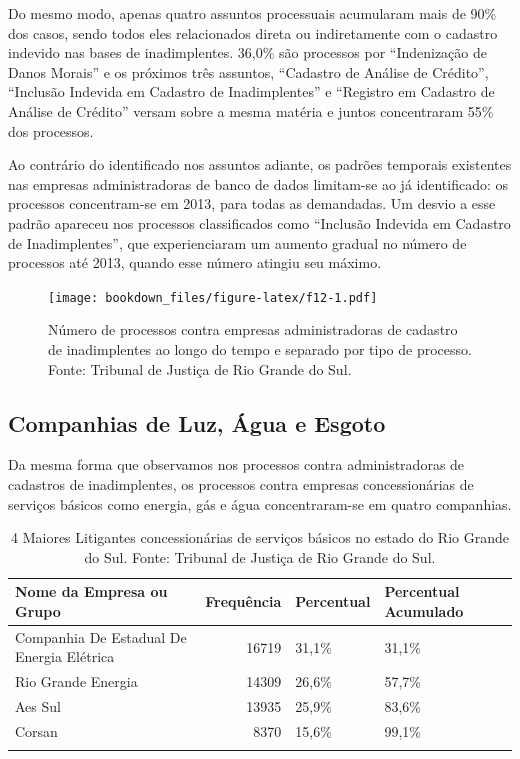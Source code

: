 \documentclass[]{report}
\begin{document}
Do mesmo modo, apenas quatro assuntos processuais acumularam mais de
90\% dos casos, sendo todos eles relacionados direta ou indiretamente
com o cadastro indevido nas bases de inadimplentes. 36,0\% são processos
por ``Indenização de Danos Morais'' e os próximos três assuntos,
``Cadastro de Análise de Crédito'', ``Inclusão Indevida em Cadastro de
Inadimplentes'' e ``Registro em Cadastro de Análise de Crédito'' versam
sobre a mesma matéria e juntos concentraram 55\% dos processos.

Ao contrário do identificado nos assuntos adiante, os padrões temporais
existentes nas empresas administradoras de banco de dados limitam-se ao
já identificado: os processos concentram-se em 2013, para todas as
demandadas. Um desvio a esse padrão apareceu nos processos classificados
como ``Inclusão Indevida em Cadastro de Inadimplentes'', que
experienciaram um aumento gradual no número de processos até 2013,
quando esse número atingiu seu máximo.

\begin{figure}[htbp]
\centering
\texttt{[image: bookdown\_files/figure-latex/f12-1.pdf]}
\caption{\label{fig:f12}Número de processos contra empresas administradoras
de cadastro de inadimplentes ao longo do tempo e separado por tipo de
processo. Fonte: Tribunal de Justiça de Rio Grande do Sul.}
\end{figure}

\subsection{Companhias de Luz, Água e
Esgoto}\label{companhias-de-luz-agua-e-esgoto}

Da mesma forma que observamos nos processos contra administradoras de
cadastros de inadimplentes, os processos contra empresas concessionárias
de serviços básicos como energia, gás e água concentraram-se em quatro
companhias.

\begin{longtable}{lrll}
\caption{4 Maiores Litigantes concessionárias de serviços básicos no estado do Rio Grande do Sul. Fonte: Tribunal de Justiça de Rio Grande do Sul.} \\
  \hline
Nome da Empresa ou Grupo & Frequência & Percentual & Percentual Acumulado \\
  \hline
Companhia
De Estadual
De Energia
Elétrica & 16719 & 31,1\% & 31,1\% \\
  Rio Grande
Energia & 14309 & 26,6\% & 57,7\% \\
  Aes Sul & 13935 & 25,9\% & 83,6\% \\
  Corsan & 8370 & 15,6\% & 99,1\% \\
   \hline
\hline
\label{unnamed-chunk-14}
\end{longtable}
\end{document}
